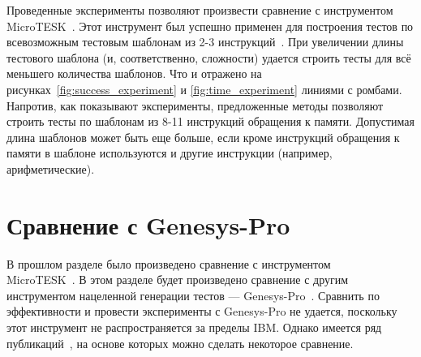 Проведенные эксперименты позволяют произвести сравнение с инструментом
MicroTESK~\cite{MicroTESK}. Этот инструмент был успешно применен для построения
тестов по всевозможным тестовым шаблонам из 2-3 инструкций~\cite{vorobyev}. При
увеличении длины тестового шаблона (и, соответственно, сложности) удается
строить тесты для всё меньшего количества шаблонов. Что и отражено на
рисунках~\ref{fig:success_experiment} и \ref{fig:time_experiment} линиями с
ромбами. Напротив, как показывают эксперименты, предложенные методы позволяют
строить тесты по шаблонам из 8-11 инструкций обращения к памяти. Допустимая
длина шаблонов может быть еще больше, если кроме инструкций обращения к памяти в
шаблоне используются и другие инструкции (например, арифметические).

\section{Сравнение с Genesys-Pro}

В прошлом разделе было произведено сравнение с инструментом\\
MicroTESK~\cite{MicroTESK}. В этом разделе будет произведено сравнение с другим
инструментом нацеленной генерации тестов --- Genesys-Pro~\cite{GenesysPro}. Сравнить
по эффективности и провести эксперименты с Genesys-Pro не удается, поскольку
этот инструмент не распространяется за пределы IBM. Однако имеется ряд
публикаций~\cite{GenesysPro2004Innovations, GenesysSolver}, на основе которых можно сделать некоторое сравнение.

